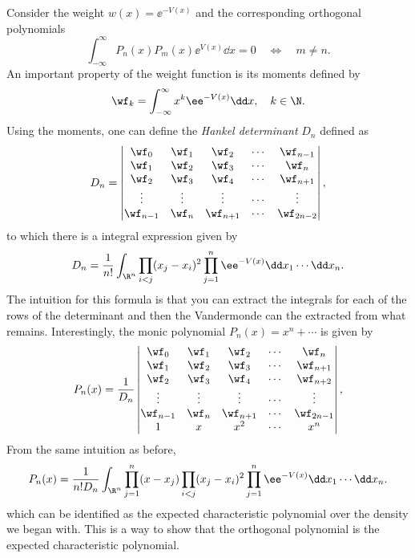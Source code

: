 
Consider the weight $w(x) = \ee^{-V(x)}$ and the corresponding orthogonal polynomials
\begin{equation}
	\int_{-\infty}^{\infty} P_n(x) P_m(x) \ee^{V(x)} \dd x = 0 \quad \iff \quad m \neq n.
\end{equation}
An important property of the weight function is its moments defined by
\begin{equation}
	\wf_k = \int_{-\infty}^{\infty} x^k \ee^{-V(x)} \dd x, \quad k \in \N.
\end{equation}
Using the moments, one can define the \textit{Hankel determinant} $D_n$ defined as
\begin{equation}
	D_n = 
	\begin{vmatrix}
		\wf_0 & 	\wf_1  & \wf_2 & \cdots & \wf_{n-1} \\
		\wf_1 & 	\wf_2  & \wf_3 & \cdots & \wf_{n} \\
		\wf_2 & 	\wf_3  & \wf_4 & \cdots & \wf_{n+1} \\
		\vdots & \vdots & \vdots & \cdots & \vdots \\
		\wf_{n-1} & 	\wf_n  & \wf_{n+1} & \cdots & \wf_{2n-2} \\
	\end{vmatrix},
\end{equation}
to which there is a integral expression given by
\begin{equation}
	D_n = \frac{1}{n!} \int_{\R^n} \prod_{i<j} (x_j - x_i)^2 \prod_{j=1}^{n} \ee^{-V(x)} \dd x_1 \cdots \dd x_n.
\end{equation}
The intuition for this formula is that you can extract the integrals for each of the rows of the determinant and then the Vandermonde can the extracted from what remains. Interestingly, the monic polynomial $P_n(x) = x^n + \cdots$ is given by 
\begin{equation}
	P_n(x) = \frac{1}{D_n}
	\begin{vmatrix}
		\wf_0 & 	\wf_1  & \wf_2 & \cdots & \wf_{n} \\
		\wf_1 & 	\wf_2  & \wf_3 & \cdots & \wf_{n+1} \\
		\wf_2 & 	\wf_3  & \wf_4 & \cdots & \wf_{n+2} \\
		\vdots & \vdots & \vdots & \cdots & \vdots \\
		\wf_{n-1} & 	\wf_n  & \wf_{n+1} & \cdots & \wf_{2n-1} \\
		1 & x  & x^2 & \cdots & x^n
	\end{vmatrix},
\end{equation}
From the same intuition as before,
\begin{equation}
	P_n(x) = \frac{1}{n! D_n} \int_{\R^n} \prod_{j=1}^{n} (x - x_j) \prod_{i<j} (x_j - x_i)^2 \prod_{j=1}^{n} \ee^{-V(x)} \dd x_1 \cdots \dd x_n.
\end{equation}
which can be identified as the expected characteristic polynomial over the density we began with. This is a way to show that the orthogonal polynomial is the expected characteristic polynomial.